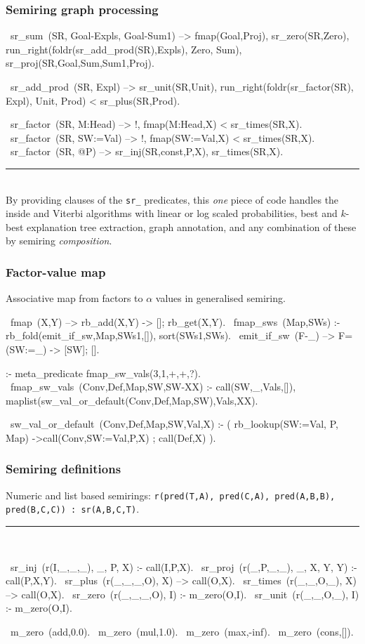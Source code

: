 \documentclass[usenames,dvipsnames]{beamer}
\newenvironment{isframe}[1][untitled]{\begin{frame}[fragile=singleslide,environment=isframe]\frametitle{#1}}{\end{frame}}
\def\pl#1{\lstinline[language={[SWI]Prolog},columns=fullflexible]{#1}}
\begin{document}
\begin{isframe}[Semiring graph processing]
\begin{prolog}[xleftmargin=0em,basicstyle=\small]
  ~sr_sum~(SR, Goal-Expls, Goal-Sum1) -->
     fmap(Goal,Proj), {sr_zero(SR,Zero)},
     run_right(foldr(sr_add_prod(SR),Expls), Zero, Sum),
     {sr_proj(SR,Goal,Sum,Sum1,Proj)}.

  ~sr_add_prod~(SR, Expl) -->
     {sr_unit(SR,Unit)},
     run_right(foldr(sr_factor(SR), Expl), Unit, Prod) <\> sr_plus(SR,Prod).

  ~sr_factor~(SR, M:Head)  --> !, fmap(M:Head,X) <\> sr_times(SR,X).
  ~sr_factor~(SR, SW:=Val) --> !, fmap(SW:=Val,X) <\> sr_times(SR,X).
  ~sr_factor~(SR, @P)  --> {sr_inj(SR,const,P,X)}, \> sr_times(SR,X).
\end{prolog}
\vspace{-1.5em}
\rule{\linewidth}{0.4pt}\\
By providing clauses of the \pl{sr_} predicates, this \emph{one} piece of code
handles the inside and Viterbi algorithms with linear or log scaled probabilities,
best and $k$-best explanation tree extraction, graph annotation, and any combination
of these by semiring \emph{composition}.
\end{isframe}

\begin{isframe}[Factor-value map]
Associative map from factors to $\alpha$ values in generalised semiring.
\begin{prolog}[xleftmargin=0em,basicstyle=\small]
  ~fmap~(X,Y) --> rb_add(X,Y) -> []; rb_get(X,Y).
  ~fmap_sws~(Map,SWs) :-
    rb_fold(emit_if_sw,Map,SWs1,[]),
    sort(SWs1,SWs).
  ~emit_if_sw~(F-_) --> {F=(SW:=_)} -> [SW]; [].

  :- meta_predicate fmap_sw_vals(3,1,+,+,?).
  ~fmap_sw_vals~(Conv,Def,Map,SW,SW-XX) :-
     call(SW,_,Vals,[]),
     maplist(sw_val_or_default(Conv,Def,Map,SW),Vals,XX).

  ~sw_val_or_default~(Conv,Def,Map,SW,Val,X) :-
     (  rb_lookup(SW:=Val, P, Map)
     ->call(Conv,SW:=Val,P,X)
     ;  call(Def,X)
     ).
\end{prolog}
\end{isframe}

\begin{isframe}[Semiring definitions]
Numeric and list based semirings: \pl{r(pred(T,A), pred(C,A), pred(A,B,B), pred(B,C,C)) : sr(A,B,C,T)}.
\rule{\linewidth}{0.4pt}\\
\begin{prolog}[xleftmargin=0em,basicstyle=\small]
  ~sr_inj~(r(I,_,_,_),  _, P, X)     :- call(I,P,X).
  ~sr_proj~(r(_,P,_,_), _, X, Y, Y) :- call(P,X,Y).
  ~sr_plus~(r(_,_,_,O), X) --> call(O,X).
  ~sr_times~(r(_,_,O,_), X) --> call(O,X).
  ~sr_zero~(r(_,_,_,O), I) :- m_zero(O,I).
  ~sr_unit~(r(_,_,O,_), I) :- m_zero(O,I).

  ~m_zero~(add,0.0).
  ~m_zero~(mul,1.0).
  ~m_zero~(max,-inf).
  ~m_zero~(cons,[]).
\end{prolog}
\end{isframe}
\end{document}

